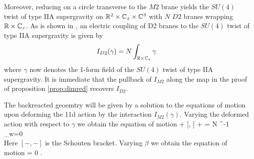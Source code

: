 Moreover, reducing on a circle transverse to the $M2$ brane yields the $SU(4)$ twist of type IIA supergravity on $\mathbb{R}^2\times \mathbb{C}_z\times \mathbb{C}^3$ with $N$ $D2$ branes wrapping $\mathbb{R}\times \mathbb{C}_z$. As is shown in \cite{CLSugra}, an electric coupling of D2 branes to the $SU(4)$ twist of type IIA supergravity is given by 
\[
I_{D2}(\gamma) = N \int_{\mathbb{R}\times\mathbb{C}_z} \gamma
\] 
where $\gamma$ now denotes the 1-form field of the $SU(4)$ twist of type IIA supergravity. It is immediate that the pullback of $I_{M2}$ along the map in the proof of proposition \ref{prop:dimred} recovers $I_{D2}$. 






The backreacted geoemtry will be given by a solution to the equations of motion upon deforming the 11d action by the interaction $I_{M2}(\gamma)$. 
Varying the deformed action with respect to $\gamma$ 
we obtain the equation of motion
\beqn\label{eqn:ads4eom1}
\dbar \mu +  [\mu, \mu] + \partial\gamma\partial\gamma = N \Omega^{-1} \delta_{w=0} \\
\eeqn
Here $[-,-]$ is the Schouten bracket. 
Varying $\beta$ we obtain the equation of motion
\beqn\label{eqn:adseom2}
\div \mu = 0 .
\eeqn


